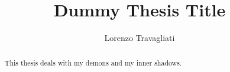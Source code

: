 \documentclass[LaM, oneside, english, noexaminfo]{sapthesis}
\title{Dummy Thesis Title}
\author{Lorenzo Travagliati}
\begin{document}
	
	\frontmatter
	\maketitle
	
	\dedication{Dedicated to\\ Satan}
	\begin{abstract}
	This thesis deals with my demons and my inner shadows.
	\end{abstract}
	
	\tableofcontents
	\mainmatter
	
	
	
	
	
	
	
	
	
\end{document}
